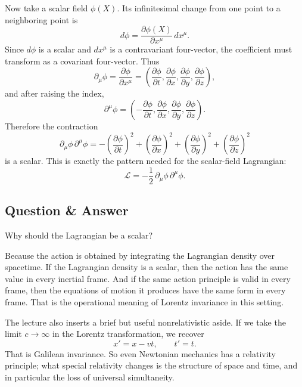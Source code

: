 Now take a scalar field \(\phi(X)\). Its infinitesimal change from one point to a neighboring point is
\begin{equation}
d\phi=\frac{\partial\phi(X)}{\partial x^\mu}\,dx^\mu.
\end{equation}
Since \(d\phi\) is a scalar and \(dx^\mu\) is a contravariant four-vector, the coefficient must transform as a covariant four-vector. Thus
\begin{equation}
\partial_\mu\phi=\frac{\partial\phi}{\partial x^\mu}
=
\left(
\frac{\partial\phi}{\partial t},
\frac{\partial\phi}{\partial x},
\frac{\partial\phi}{\partial y},
\frac{\partial\phi}{\partial z}
\right),
\end{equation}
and after raising the index,
\begin{equation}
\partial^\mu\phi
=
\left(
-\frac{\partial\phi}{\partial t},
\frac{\partial\phi}{\partial x},
\frac{\partial\phi}{\partial y},
\frac{\partial\phi}{\partial z}
\right).
\end{equation}
Therefore the contraction
\begin{equation}
\partial_\mu\phi\,\partial^\mu\phi
=
-\left(\frac{\partial\phi}{\partial t}\right)^2
+\left(\frac{\partial\phi}{\partial x}\right)^2
+\left(\frac{\partial\phi}{\partial y}\right)^2
+\left(\frac{\partial\phi}{\partial z}\right)^2
\end{equation}
is a scalar. This is exactly the pattern needed for the scalar-field Lagrangian:
\begin{equation}
\mathcal L=-\frac12\,\partial_\mu\phi\,\partial^\mu\phi.
\end{equation}

\subsection{Question \& Answer}

Why should the Lagrangian be a scalar?

Because the action is obtained by integrating the Lagrangian density over spacetime. If the Lagrangian density is a scalar, then the action has the same value in every inertial frame. And if the same action principle is valid in every frame, then the equations of motion it produces have the same form in every frame. That is the operational meaning of Lorentz invariance in this setting.

The lecture also inserts a brief but useful nonrelativistic aside. If we take the limit \(c\to\infty\) in the Lorentz transformation, we recover
\begin{equation}
x'=x-vt,
\qquad
t'=t.
\end{equation}
That is Galilean invariance. So even Newtonian mechanics has a relativity principle; what special relativity changes is the structure of space and time, and in particular the loss of universal simultaneity.

